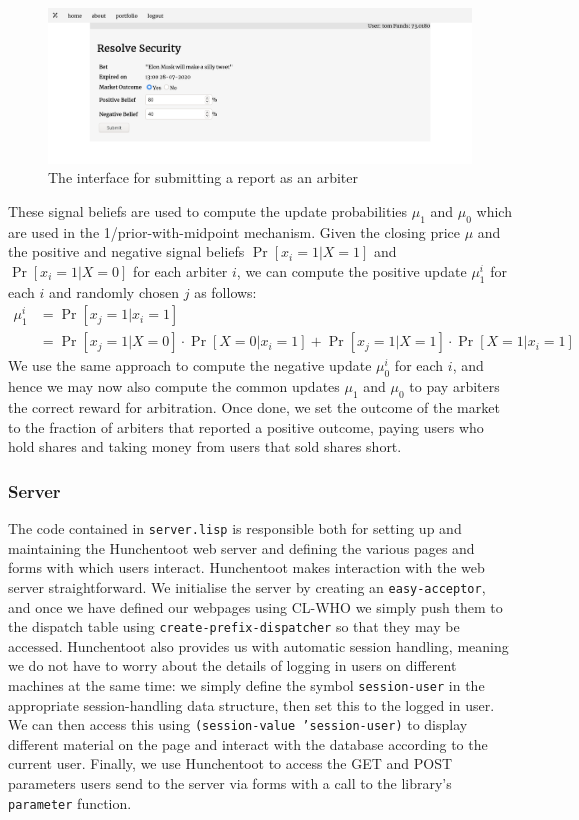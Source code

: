\documentclass[10pt,a4paper]{article}
\theoremstyle{plain}
\theoremstyle{definition}
\newcommand{\code}[1]{\texttt{#1}}
\begin{document}
\begin{figure}[h]
	\centering
	\includegraphics[width=.8\textwidth]{arbitration}
	\caption{The interface for submitting a report as an arbiter}
	\label{fig:resolveSecurity}
\end{figure}

These signal beliefs are used to compute the update probabilities $\mu_1$ and
$\mu_0$ which are used in the 1/prior-with-midpoint mechanism. Given the
closing price $\mu$ and the positive and negative signal beliefs
$\Pr[x_i=1|X=1]$ and $\Pr[x_i=1|X=0]$ for each arbiter $i$, we can compute the
positive update $\mu_1^i$ for each $i$ and randomly chosen $j$ as follows:
%
\begin{equation}
	\begin{aligned}
		\mu_1^i & = \Pr[x_j=1|x_i=1] \\
		& = \Pr[x_j=1|X=0] \cdot \Pr[X=0|x_i=1] + \Pr[x_j=1|X=1] \cdot
		\Pr[X=1|x_i=1]
	\end{aligned}
\end{equation}
%
We use the same approach to compute the negative update $\mu_0^i$ for each $i$,
and hence we may now also compute the common updates $\mu_1$ and $\mu_0$ to pay
arbiters the correct reward for arbitration. Once done, we set the outcome of
the market to the fraction of arbiters that reported a positive outcome, paying
users who hold shares and taking money from users that sold shares short.

\subsubsection{Server}

The code contained in \code{server.lisp} is responsible both for setting up and
maintaining the Hunchentoot web server and defining the various pages and forms
with which users interact.  Hunchentoot makes interaction with the web server
straightforward. We initialise the server by creating an \code{easy-acceptor},
and once we have defined our webpages using CL-WHO we simply push them to the
dispatch table using \code{create-prefix-dispatcher} so that they may be
accessed. Hunchentoot also provides us with automatic session handling, meaning
we do not have to worry about the details of logging in users on different
machines at the same time: we simply define the symbol \code{session-user} in
the appropriate session-handling data structure, then set this to the logged in
user. We can then access this using \code{(session-value 'session-user)} to
display different material on the page and interact with the database according
to the current user. Finally, we use Hunchentoot to access the GET and POST
parameters users send to the server via forms with a call to the library's
\code{parameter} function. 
\end{document}
